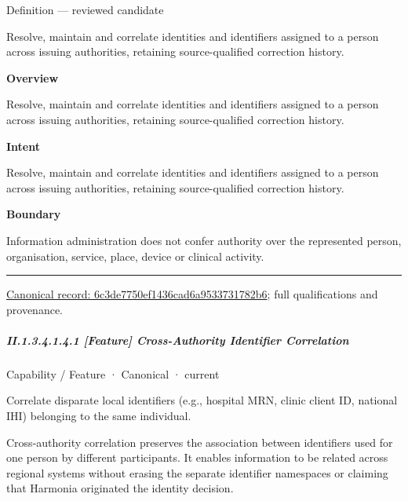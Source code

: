 Definition — reviewed candidate



Resolve, maintain and correlate identities and identifiers assigned to a person across issuing authorities, retaining source-qualified correction history.



\textbf{Overview}



Resolve, maintain and correlate identities and identifiers assigned to a person across issuing authorities, retaining source-qualified correction history.



\textbf{Intent}



Resolve, maintain and correlate identities and identifiers assigned to a person across issuing authorities, retaining source-qualified correction history.



\textbf{Boundary}



Information administration does not confer authority over the represented person, organisation, service, place, device or clinical activity.



\medskip\hrule\medskip

{\footnotesize \href{../../../../../../../continuum/strategy/capability/6c3de7750ef1436cad6a9533731782b6.md}{Canonical record: 6c3de7750ef1436cad6a9533731782b6}; full qualifications and provenance.}\par
\subparagraph*{II.1.3.4.1.4.1 [Feature] Cross-Authority Identifier Correlation}
\label{navigation:II.1.3.4.1.4.1}

\label{element:6d74d143c7454fa0bf30743ddf7ba094}
{\small Capability / Feature · Canonical · current}\par

Correlate disparate local identifiers (e.g., hospital MRN, clinic client ID, national IHI) belonging to the same individual.



Cross-authority correlation preserves the association between identifiers used for one person by different participants. It enables information to be related across regional systems without erasing the separate identifier namespaces or claiming that Harmonia originated the identity decision.


